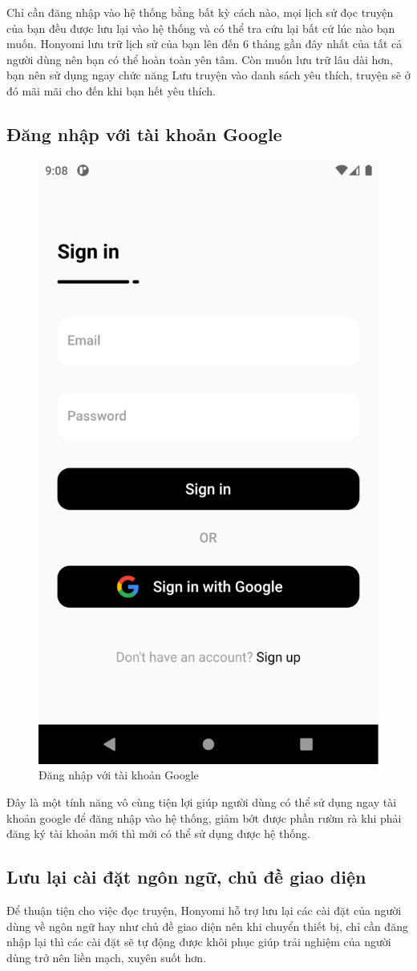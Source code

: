 \documentclass[./../main.tex]{subfiles}
\begin{document}
Chỉ cần đăng nhập vào hệ thống bằng bất kỳ cách nào, mọi lịch sử đọc truyện của bạn đều được lưu lại vào hệ thống và có thể tra cứu lại bất cứ lúc nào bạn muốn. Honyomi lưu trữ lịch sử của bạn lên đến 6 tháng gần đây nhất của tất cả người dùng nên bạn có thể hoàn toàn yên tâm. Còn muốn lưu trữ lâu dài hơn, bạn nên sử dụng ngay chức năng Lưu truyện vào danh sách yêu thích, truyện sẽ ở đó mãi mãi cho đến khi bạn hết yêu thích.
\subsection{Đăng nhập với tài khoản Google}

\begin{figure}[!htb]
	\centering
	\includegraphics[width=0.5\linewidth]{./images/google.png}
	\caption{Đăng nhập với tài khoản Google}
\end{figure}


Đây là một tính năng vô cùng tiện lợi giúp người dùng có thể sử dụng ngay tài khoản google để đăng nhập vào hệ thống, giảm bớt được phần rườm rà khi phải đăng ký tài khoản mới thì mới có thể sử dụng được hệ thống.
\subsection{Lưu lại cài đặt ngôn ngữ, chủ đề giao diện}
Để thuận tiện cho việc đọc truyện, Honyomi hỗ trợ lưu lại các cài đặt của người dùng về ngôn ngữ hay như chủ đề giao diện nên khi chuyển thiết bị, chỉ cần đăng nhập lại thì các cài đặt sẽ tự động được khôi phục giúp trải nghiệm của người dùng trở nên liền mạch, xuyên suốt hơn.
\end{document}
